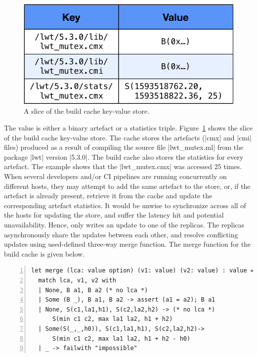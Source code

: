 \begin{figure}
	\vspace{-0.8cm}
	\centering
	\includegraphics[scale=0.45]{figures/buildcache}
	\caption{A slice of the build cache key-value store.}
	\label{fig:buildcache}
	\vspace{-2.0cm}
\end{figure}
The value is either a binary artefact or a statistics triple.
Figure~\ref{fig:buildcache} shows the slice of the build cache key-value store.
The cache stores the artefacts (|cmx| and |cmi| files) produced as a result of
compiling the source file |lwt_mutex.ml| from the package |lwt| version
|5.3.0|. The build cache also stores the statistics for every artefact. The
example shows that the |lwt_mutex.cmx| was accessed 25 times. When several
developers and/or CI pipelines are running concurrently on different hosts,
they may attempt to add the same artefact to the store, or, if the artefact is
already present, retrieve it from the cache and update the corresponding
artefact statistics. It would be unwise to synchronize across all of the hosts
for updating the store, and suffer the latency hit and potential
unavailability. Hence, \name only writes an update to one of the replicas. The
replicas asynchronously share the updates between each other, and resolve
conflicting updates using used-defined three-way merge function. The merge
function for the build cache is given below.

\begin{lstlisting}[language=caml, numbers=left]
let merge (lca: value option) (v1: value) (v2: value) : value =
  match lca, v1, v2 with
  | None, B a1, B a2 (* no lca *)
  | Some (B _), B a1, B a2 -> assert (a1 = a2); B a1
  | None, S(c1,la1,h1), S(c2,la2,h2) -> (* no lca *)
      S(min c1 c2, max la1 la2, h1 + h2)
  | Some(S(_,_,h0)), S(c1,la1,h1), S(c2,la2,h2)->
      S(min c1 c2, max la1 la2, h1 + h2 - h0)
  | _ -> failwith "impossible"
\end{lstlisting}

